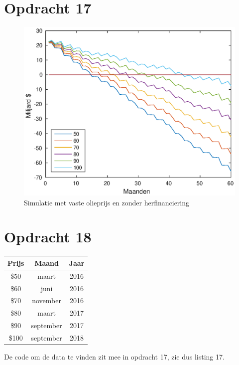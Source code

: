 \documentclass[11pt,a4paper]{article}
\begin{document}


\section*{Opdracht 17}
\begin{figure}[H]
\centering
\includegraphics[scale=0.75]{opdracht17}
\caption{Simulatie met vaste olieprijs en zonder herfinanciering}
\end{figure}



\section*{Opdracht 18}
\begin{table}[H]
\centering
\begin{tabular}{c|c|c}
Prijs & Maand & Jaar\\
\hline
\$50 & maart & 2016\\
\$60 & juni & 2016\\
\$70 & november & 2016\\
\$80 & maart & 2017\\
\$90 & september & 2017\\
\$100 & september & 2018\\
\end{tabular}
\end{table}
De code om de data te vinden zit mee in opdracht 17, zie dus listing 17.
\end{document}
